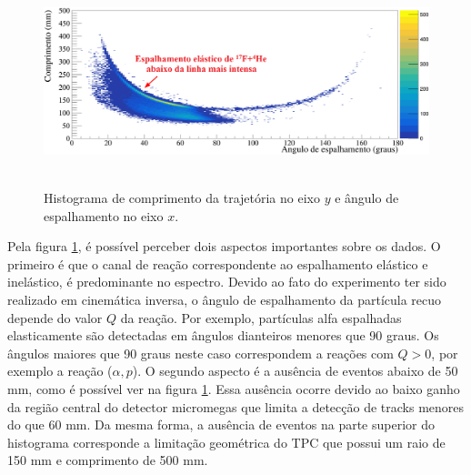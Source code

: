 \documentclass[a4paper,12pt,oneside]{book}
\begin{document}
\begin{figure}[H]
    \centering
    \includegraphics[scale = 0.5, width=\columnwidth]{figs/comp_vs_ang_n2_2.png}\
    \caption{Histograma de comprimento da trajetória no eixo $y$ e ângulo de espalhamento no eixo $x$.}
    \label{fig:comp_vs_ang}
\end{figure}

\par Pela figura \ref{fig:comp_vs_ang}, é possível perceber dois aspectos importantes sobre os dados. O primeiro é que o canal de reação correspondente ao espalhamento elástico e inelástico, é predominante no espectro. Devido ao fato do experimento ter sido realizado em cinemática inversa, o ângulo de espalhamento da partícula recuo depende do valor $Q$ da reação. Por exemplo, partículas alfa espalhadas elasticamente são detectadas em ângulos dianteiros menores que 90 graus. Os ângulos maiores que 90 graus neste caso correspondem a reações com $Q>0$, por exemplo a reação ($\alpha, p$). O segundo aspecto é a ausência de eventos abaixo de 50 mm, como é possível ver na figura \ref{fig:comp_vs_ang}. Essa ausência ocorre devido ao baixo ganho da região central do detector micromegas que limita a detecção de tracks menores do que 60 mm. Da mesma forma, a ausência de eventos na parte superior do histograma corresponde a limitação geométrica do TPC que possui um raio de 150 mm e comprimento de 500 mm.

\end{document}
